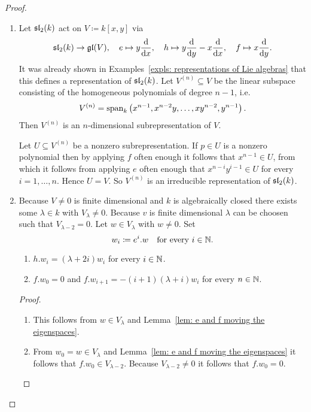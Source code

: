 \begin{proof}
 \begin{enumerate}[leftmargin=*]
  \item
   Let $\mathfrak{sl}_2(k)$ act on $V \coloneqq k[x,y]$ via
   \[
    \mathfrak{sl}_2(k) \to \mathfrak{gl}(V), \quad
    e \mapsto y\frac{\text{d}}{\text{d}x}, \quad
    h \mapsto y\frac{\text{d}}{\text{d}y}-x\frac{\text{d}}{\text{d}x}, \quad
    f \mapsto x\frac{\text{d}}{\text{d}y}.
   \]
   It was already shown in Examples~\ref{expls: representations of Lie algebras} that this defines a representation of $\mathfrak{sl}_2(k)$. Let $V^{(n)} \subseteq V$ be the linear subspace consisting of the homogeneous polynomials of degree $n-1$, i.e.\
   \[
    V^{(n)} = \operatorname{span}_k\left( x^{n-1}, x^{n-2} y, \dotsc, x y^{n-2}, y^{n-1} \right).
   \]
   Then $V^{(n)}$ is an $n$-dimensional subrepresentation of $V$.
   
   Let $U \subseteq V^{(n)}$ be a nonzero subrepresentation. If $p \in U$ is a nonzero polynomial then by applying $f$ often enough it follows that $x^{n-1} \in U$, from which it follows from applying $e$ often enough that $x^{n-i} y^{i-1} \in U$ for every $i = 1, \dotsc, n$. Hence $U = V$. So $V^{(n)}$ is an irreducible representation of $\mathfrak{sl}_2(k)$.
   
  \item
   Because $V \neq 0$ is finite dimensional and $k$ is algebraically closed there exists some $\lambda \in k$ with $V_\lambda \neq 0$. Because $v$ is finite dimensional $\lambda$ can be choosen such that $V_{\lambda-2} = 0$. Let $w \in V_\lambda$ with $w \neq 0$. Set
   \[
    w_i \coloneqq e^i.w \quad \text{for every $i \in \mathbb{N}$}.
   \]
   \begin{claim*}
    \begin{enumerate}[leftmargin=*]
     \item
      $h.w_i = (\lambda+2i) w_i$ for every $i \in \mathbb{N}$.
     \item
      $f.w_0 = 0$ and $f.w_{i+1} = -(i+1)(\lambda+i)w_i$ for every $n \in \mathbb{N}$.
    \end{enumerate}
   \end{claim*}
   \begin{proof}
    \begin{enumerate}[leftmargin=*]
     \item
      This follows from $w \in V_\lambda$ and Lemma~\ref{lem: e and f moving the eigenspaces}.
     \item
      From $w_0 = w \in V_\lambda$ and Lemma~\ref{lem: e and f moving the eigenspaces} it follows that $f.w_0 \in V_{\lambda-2}$. Because $V_{\lambda-2} \neq 0$ it follows that $f.w_0 = 0$.
      

\end{enumerate}
\end{proof}
\end{enumerate}
\end{proof}
